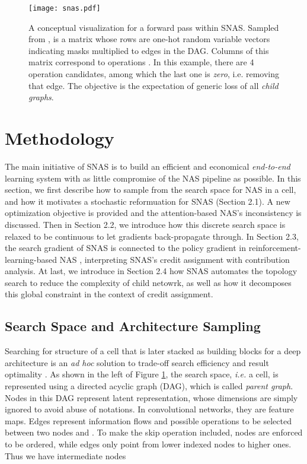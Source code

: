 \documentclass{article} \usepackage{iclr2019_conference,times}
\newcommand{\zh}{\color{black}}
\begin{document}
\begin{figure}[h]
  \centering
  \texttt{[image: snas.pdf]}
  \caption{A conceptual visualization for a forward pass within SNAS. Sampled from ,  is a matrix whose rows  are one-hot random variable vectors indicating masks multiplied to edges  in the DAG. Columns of this matrix correspond to operations . In this example, there are 4 operation candidates, among which the last one is \textit{zero}, i.e. removing that edge. The objective is the expectation of generic loss  of all \textit{child graphs}.}
  \label{fig:sampling}
\end{figure}

\section{Methodology}
The main initiative of SNAS is to build an efficient and economical \textit{end-to-end} learning system with as little compromise of the NAS pipeline as possible. In this section, we first describe how to sample from the search space for NAS in a cell, and how it motivates a stochastic reformuation for SNAS (Section 2.1). A new optimization objective is provided and the attention-based NAS's inconsistency is discussed. Then in Section 2.2, we introduce how this discrete search space is relaxed to be continuous to let gradients back-propagate through. In Section 2.3, the search gradient of SNAS is connected to the policy gradient in reinforcement-learning-based NAS \citep{zoph2016neural, pham2018efficient}, interpreting SNAS's credit assignment with contribution analysis. At last, we introduce in Section 2.4 how SNAS automates the topology search to reduce the complexity of child netowrk, as well as how it decomposes this global constraint in the context of credit assignment. 

\subsection{Search Space and Architecture Sampling}
Searching for structure of a cell that is later stacked as building blocks for a deep architecture is an \textit{ad hoc} solution to trade-off search efficiency and result optimality \citep{zoph2017learning, liu2017progressive, real2018regularized, pham2018efficient, liu2018darts}. As shown in the left of Figure \ref{fig:sampling}, the search space, \textit{i.e.} a cell, is represented using a directed acyclic graph (DAG), which is called \textit{parent graph}. Nodes  in this DAG represent latent representation{\zh ,} whose dimensions are simply ignored to avoid abuse of notations. In convolutional networks, they are feature maps. Edges  represent information flows and possible operations  to be selected between two nodes  and . To make the skip operation included, nodes are enforced to be ordered, while edges only point from lower indexed nodes to higher ones. Thus we have intermediate nodes
\end{document}

